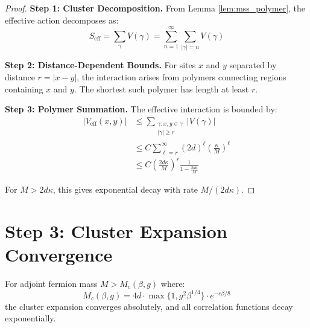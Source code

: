 \begin{proof}
\textbf{Step 1: Cluster Decomposition.}
From Lemma \ref{lem:mss_polymer}, the effective action decomposes as:
\begin{equation}
S_{\text{eff}} = \sum_{\gamma} V(\gamma) = \sum_{n=1}^{\infty} \sum_{|\gamma|=n} V(\gamma)
\end{equation}

\textbf{Step 2: Distance-Dependent Bounds.}
For sites $x$ and $y$ separated by distance $r = |x-y|$, the interaction arises 
from polymers connecting regions containing $x$ and $y$. The shortest such 
polymer has length at least $r$.

\textbf{Step 3: Polymer Summation.}
The effective interaction is bounded by:
\begin{align}
|V_{\text{eff}}(x,y)| &\leq \sum_{\substack{\gamma: x,y \in \gamma \\ |\gamma| \geq r}} |V(\gamma)| \\
&\leq C \sum_{\ell=r}^{\infty} (2d)^\ell \left(\frac{\kappa}{M}\right)^\ell \\
&\leq C \left(\frac{2d\kappa}{M}\right)^r \frac{1}{1 - \frac{2d\kappa}{M}}
\end{align}

For $M > 2d\kappa$, this gives exponential decay with rate $M/(2d\kappa)$.
\end{proof}

\section{Step 3: Cluster Expansion Convergence}

\begin{theorem}
\label{thm:cluster_convergence_fermion}
For adjoint fermion mass $M > M_c(\beta, g)$ where:
\begin{equation}
M_c(\beta, g) = 4d \cdot \max\{1, g^2\beta^{1/4}\} \cdot e^{-c\beta/8}
\end{equation}
the cluster expansion converges absolutely, and all correlation functions decay exponentially.
\end{theorem}

